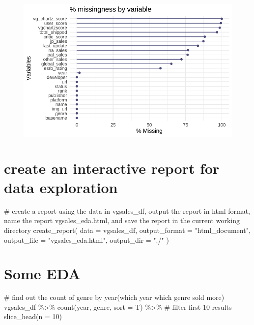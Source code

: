 \documentclass[
  letterpaper,
  DIV=11,
  numbers=noendperiod]{scrartcl}
\newenvironment{Shaded}{\begin{snugshade}}{\end{snugshade}}
\newcommand{\AttributeTok}[1]{\textcolor[rgb]{0.40,0.45,0.13}{#1}}
\newcommand{\CommentTok}[1]{\textcolor[rgb]{0.37,0.37,0.37}{#1}}
\newcommand{\DecValTok}[1]{\textcolor[rgb]{0.68,0.00,0.00}{#1}}
\newcommand{\FunctionTok}[1]{\textcolor[rgb]{0.28,0.35,0.67}{#1}}
\newcommand{\NormalTok}[1]{\textcolor[rgb]{0.00,0.23,0.31}{#1}}
\newcommand{\SpecialCharTok}[1]{\textcolor[rgb]{0.37,0.37,0.37}{#1}}
\newcommand{\StringTok}[1]{\textcolor[rgb]{0.13,0.47,0.30}{#1}}
\begin{document}
\begin{figure}[H]

{\centering \includegraphics{data-cleainig_files/figure-pdf/unnamed-chunk-2-1.pdf}

}

\end{figure}

\hypertarget{create-an-interactive-report-for-data-exploration}{%
\section{create an interactive report for data
exploration}\label{create-an-interactive-report-for-data-exploration}}

\begin{Shaded}
\begin{Highlighting}[]
\CommentTok{\# create a report using the data in vgsales\_df, output the report in html format, name the report vgsales\_eda.html, and save the report in the current working directory}
\FunctionTok{create\_report}\NormalTok{(}
  \AttributeTok{data =}\NormalTok{ vgsales\_df, }
  \AttributeTok{output\_format =} \StringTok{"html\_document"}\NormalTok{, }
  \AttributeTok{output\_file =} \StringTok{"vgsales\_eda.html"}\NormalTok{, }
  \AttributeTok{output\_dir =} \StringTok{"./"}
\NormalTok{)}
\end{Highlighting}
\end{Shaded}

\hypertarget{some-eda}{%
\section{Some EDA}\label{some-eda}}

\begin{Shaded}
\begin{Highlighting}[]
\CommentTok{\# find out the count of genre by year(which year which genre sold more)}
\NormalTok{vgsales\_df }\SpecialCharTok{\%\textgreater{}\%} 
  \FunctionTok{count}\NormalTok{(year, genre, }\AttributeTok{sort =}\NormalTok{ T) }\SpecialCharTok{\%\textgreater{}\%} 
  \CommentTok{\# filter first 10 results}
  \FunctionTok{slice\_head}\NormalTok{(}\AttributeTok{n =} \DecValTok{10}\NormalTok{)}
\end{Highlighting}
\end{Shaded}
\end{document}
